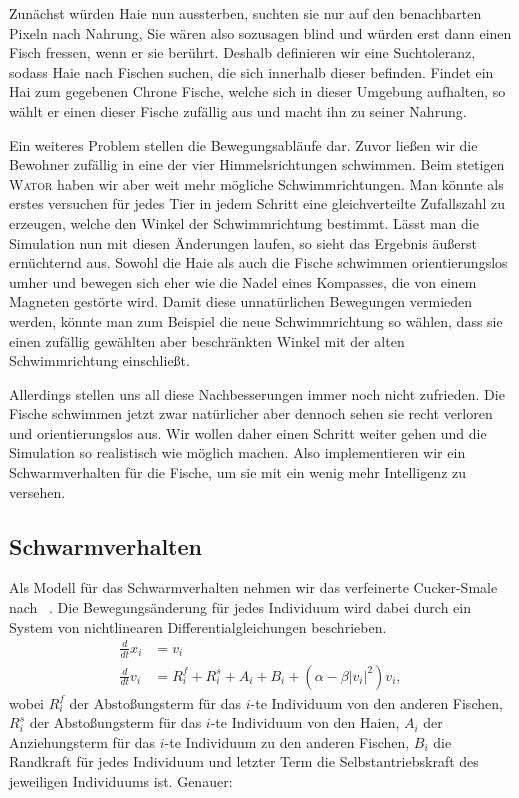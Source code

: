 \documentclass[a4paper,11pt]{article}
\newcommand{\wator}{\textsc{Wator }}
\theoremstyle{definition}
\numberwithin{equation}{section}
\begin{document}
	Zunächst würden Haie nun aussterben, suchten sie nur auf den benachbarten Pixeln nach Nahrung, Sie wären also sozusagen blind und würden erst dann einen Fisch fressen, wenn er sie berührt. Deshalb definieren wir eine Suchtoleranz, sodass Haie nach Fischen suchen, die sich innerhalb dieser befinden. Findet ein Hai zum gegebenen Chrone Fische, welche sich in dieser Umgebung aufhalten, so wählt er einen dieser Fische zufällig aus und macht ihn zu seiner Nahrung.\newline
	
	Ein weiteres Problem stellen die Bewegungsabläufe dar. Zuvor ließen wir die Bewohner zufällig in eine der vier Himmelsrichtungen schwimmen. Beim stetigen \wator haben wir aber weit mehr mögliche Schwimmrichtungen. Man könnte als erstes versuchen für jedes Tier in jedem Schritt eine gleichverteilte Zufallszahl zu erzeugen, welche den Winkel der Schwimmrichtung bestimmt.
	Lässt man die Simulation nun mit diesen Änderungen laufen, so sieht das Ergebnis äußerst ernüchternd aus.
	Sowohl die Haie als auch die Fische schwimmen orientierungslos umher und bewegen sich eher wie die Nadel eines Kompasses, die von einem Magneten gestörte wird. 
	Damit diese unnatürlichen Bewegungen vermieden werden, könnte man zum Beispiel die neue Schwimmrichtung so wählen, dass sie einen zufällig gewählten aber beschränkten Winkel mit der alten Schwimmrichtung einschließt.\newline
	
	Allerdings stellen uns all diese Nachbesserungen immer noch nicht zufrieden. Die Fische schwimmen jetzt zwar natürlicher aber dennoch sehen sie recht verloren und orientierungslos aus. Wir wollen daher einen Schritt weiter gehen und die Simulation so realistisch wie möglich machen. Also implementieren wir ein Schwarmverhalten für die Fische, um sie mit ein wenig mehr Intelligenz zu versehen.
	
	\subsection{Schwarmverhalten}
	Als Modell für das Schwarmverhalten nehmen wir das verfeinerte Cucker-Smale nach ~\cite{agueh2011analysis}. 
	Die Bewegungsänderung für jedes Individuum wird dabei durch ein System von nichtlinearen Differentialgleichungen beschrieben.
	\begin{align*}
		\frac{d}{dt}x_i &= v_i\\
		\frac{d}{dt}v_i &= R^f_i + R^s_i + A_i  + B_i + (\alpha - \beta |v_i|^2)v_i,
	\end{align*}
	wobei $R^f_i$ der Abstoßungsterm für das $i$-te Individuum von den anderen Fischen, $R^s_i$ der Abstoßungsterm für das $i$-te Individuum von den Haien, $A_i$ der Anziehungsterm für das $i$-te Individuum zu den anderen Fischen, $B_i$ die Randkraft für jedes Individuum und letzter Term die Selbstantriebskraft des jeweiligen Individuums ist.\newline
	Genauer:
\end{document}
